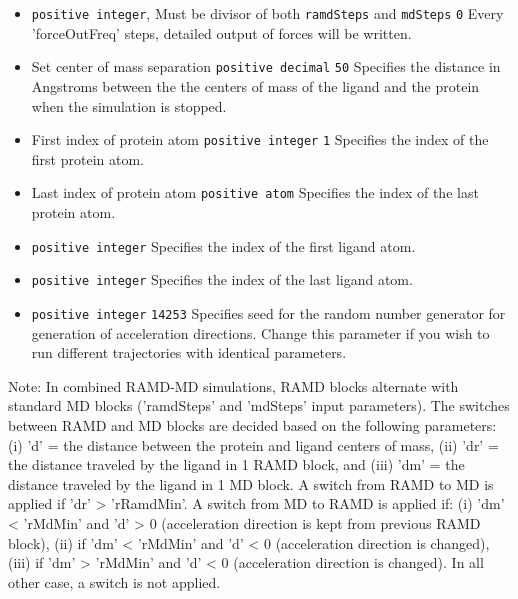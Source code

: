 \begin{itemize}
\item
{} {{\tt positive integer}, Must be divisor of both {\tt ramdSteps} and {\tt mdSteps}} {{\tt 0}} { Every 'forceOutFreq' steps, detailed output of forces will be written.} 

\item
{} {Set center of mass separation} {{\tt positive decimal}} {{\tt 50}} { Specifies the distance in Angstroms between the the centers of mass of the ligand and the protein when the simulation is stopped.}
 
\item
{} {First index of protein atom} {{\tt positive integer}} {{\tt 1}} { Specifies the index of the first protein atom.}
 
\item
{} {Last index of protein atom} {{\tt positive atom}} { Specifies the index of the last protein atom. } 

\item
{} {{\tt positive integer}} {Specifies the index of the first ligand atom.}

\item
{} {{\tt positive integer}} {Specifies the index of the last ligand atom. }

\item
{} {{\tt positive integer}} {{\tt 14253}} {Specifies seed for the random number generator for generation of acceleration directions. Change this parameter if you wish to run different trajectories with identical parameters.}

\end{itemize}

Note: 
In combined RAMD-MD simulations, RAMD blocks alternate with standard MD blocks ('ramdSteps' and 'mdSteps' input parameters). The switches between RAMD and MD blocks are decided based on the following parameters: (i) 'd' =  the distance between the protein and ligand centers of mass, (ii) 'dr' = the distance traveled by the ligand in 1 RAMD block, and (iii) 'dm' = the distance traveled by the ligand in 1 MD block. A switch from RAMD to MD is applied if 'dr' > 'rRamdMin'. A switch from MD to RAMD is applied if: (i) 'dm' < 'rMdMin' and 'd' > 0 (acceleration direction is kept from previous RAMD block), (ii) if 'dm' < 'rMdMin' and 'd' < 0 (acceleration direction is changed), (iii) if 'dm' > 'rMdMin' and 'd' < 0 (acceleration direction is changed). In all other case, a switch is not applied.
 
